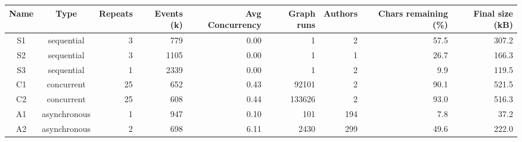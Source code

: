 \begin{tabular}{ccrrrrrrr}
\toprule
\textbf{Name} &
\textbf{Type} &
\textbf{Repeats} &
\textbf{Events (k)} &
\textbf{Avg Concurrency} &
\textbf{Graph runs} &
\textbf{Authors} &
\textbf{Chars remaining (\%)} &
\textbf{Final size (kB)} \\\midrule
S1 & sequential & 3 & 779 & 0.00 & 1 & 2 & 57.5 & 307.2 \\
S2 & sequential & 3 & 1105 & 0.00 & 1 & 1 & 26.7 & 166.3 \\
S3 & sequential & 1 & 2339 & 0.00 & 1 & 2 & 9.9 & 119.5 \\
C1 & concurrent & 25 & 652 & 0.43 & 92101 & 2 & 90.1 & 521.5 \\
C2 & concurrent & 25 & 608 & 0.44 & 133626 & 2 & 93.0 & 516.3 \\
A1 & asynchronous & 1 & 947 & 0.10 & 101 & 194 & 7.8 & 37.2 \\
A2 & asynchronous & 2 & 698 & 6.11 & 2430 & 299 & 49.6 & 222.0 \\
\bottomrule
\end{tabular}